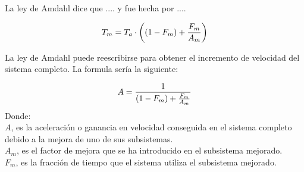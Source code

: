 \documentclass{report}
\begin{document}
La ley de Amdahl dice que .... y fue hecha por ....

\begin{displaymath}	
	{T_{m} = {T_{a} \cdot \left((1 - F_{m}) + {F_{m} \over A_{m}}\right)}}
\end{displaymath}

La ley de Amdahl puede reescribirse para obtener el incremento de velocidad del sistema completo. La formula sería la siguiente:

\begin{displaymath}	
	A = {1 \over (1 - F_{m}) + {F_{m} \over A_{m}}}	
\end{displaymath}
Donde:\\
$A$, es la aceleración o ganancia en velocidad conseguida en el sistema completo debido a la mejora de uno de sus subsistemas.\\
$A_{m}$, es el factor de mejora que se ha introducido en el subsistema mejorado.\\
$F_{m} $, es la fracción de tiempo que el sistema utiliza el subsistema mejorado.\\









%

\end{document}
